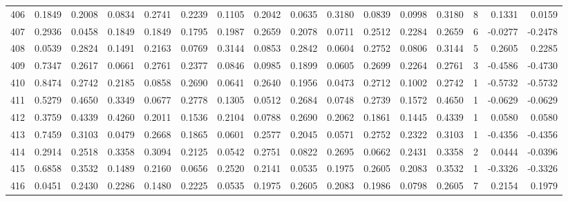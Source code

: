 \begin{tabular}{lrrrrrrrrrrrrrrr}
406 &      0.1849 &  0.2008 &  0.0834 &  0.2741 &  0.2239 &  0.1105 &  0.2042 &  0.0635 &  0.3180 &  0.0839 &   0.0998 &     0.3180 &      8 &                    0.1331 &                     0.0159 \\
407 &      0.2936 &  0.0458 &  0.1849 &  0.1849 &  0.1795 &  0.1987 &  0.2659 &  0.2078 &  0.0711 &  0.2512 &   0.2284 &     0.2659 &      6 &                   -0.0277 &                    -0.2478 \\
408 &      0.0539 &  0.2824 &  0.1491 &  0.2163 &  0.0769 &  0.3144 &  0.0853 &  0.2842 &  0.0604 &  0.2752 &   0.0806 &     0.3144 &      5 &                    0.2605 &                     0.2285 \\
409 &      0.7347 &  0.2617 &  0.0661 &  0.2761 &  0.2377 &  0.0846 &  0.0985 &  0.1899 &  0.0605 &  0.2699 &   0.2264 &     0.2761 &      3 &                   -0.4586 &                    -0.4730 \\
410 &      0.8474 &  0.2742 &  0.2185 &  0.0858 &  0.2690 &  0.0641 &  0.2640 &  0.1956 &  0.0473 &  0.2712 &   0.1002 &     0.2742 &      1 &                   -0.5732 &                    -0.5732 \\
411 &      0.5279 &  0.4650 &  0.3349 &  0.0677 &  0.2778 &  0.1305 &  0.0512 &  0.2684 &  0.0748 &  0.2739 &   0.1572 &     0.4650 &      1 &                   -0.0629 &                    -0.0629 \\
412 &      0.3759 &  0.4339 &  0.4260 &  0.2011 &  0.1536 &  0.2104 &  0.0788 &  0.2690 &  0.2062 &  0.1861 &   0.1445 &     0.4339 &      1 &                    0.0580 &                     0.0580 \\
413 &      0.7459 &  0.3103 &  0.0479 &  0.2668 &  0.1865 &  0.0601 &  0.2577 &  0.2045 &  0.0571 &  0.2752 &   0.2322 &     0.3103 &      1 &                   -0.4356 &                    -0.4356 \\
414 &      0.2914 &  0.2518 &  0.3358 &  0.3094 &  0.2125 &  0.0542 &  0.2751 &  0.0822 &  0.2695 &  0.0662 &   0.2431 &     0.3358 &      2 &                    0.0444 &                    -0.0396 \\
415 &      0.6858 &  0.3532 &  0.1489 &  0.2160 &  0.0656 &  0.2520 &  0.2141 &  0.0535 &  0.1975 &  0.2605 &   0.2083 &     0.3532 &      1 &                   -0.3326 &                    -0.3326 \\
416 &      0.0451 &  0.2430 &  0.2286 &  0.1480 &  0.2225 &  0.0535 &  0.1975 &  0.2605 &  0.2083 &  0.1986 &   0.0798 &     0.2605 &      7 &                    0.2154 &                     0.1979 \\

\end{tabular}

